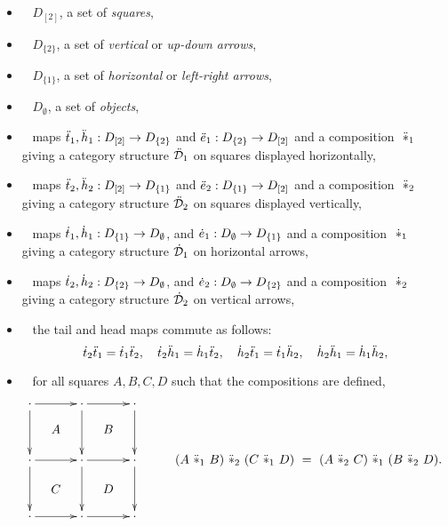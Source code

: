 \begin{itemize}
\item~ $D_{[2]}$, a set of \emph{squares},
\item~ $D_{\{2\}}$, a set of \emph{vertical} 
or \emph{up-down arrows},
\item~ $D_{\{1\}}$, a set of \emph{horizontal} 
or \emph{left-right arrows},
\item~ $D_{\emptyset}$, a set of \emph{objects}, 
\item~ maps $\ddot{t}_1,\ddot{h}_1 : D_{[2]} \to D_{\{2\}}$ 
       and $\ddot{e}_1 : D_{\{2\}} \to D_{[2]}$ 
       and a composition $~\ddot{\ast}_1~$ giving a category structure 
       $\ddot{\mathcal{D}}_1$ on squares displayed horizontally, 
\item~ maps $\ddot{t}_2,\ddot{h}_2 : D_{[2]} \to D_{\{1\}}$
       and $\ddot{e}_2 : D_{\{1\}} \to D_{[2]}$ 
       and a composition $~\ddot{\ast}_2~$ giving a category structure 
       $\ddot{\mathcal{D}}_2$ on squares displayed vertically, 
\item~ maps $\dot{t}_1,\dot{h}_1 : D_{\{1\}} \to D_{\emptyset}$, 
       and $\dot{e}_1 : D_{\emptyset} \to D_{\{1\}}$ 
       and a composition $~\dot{\ast}_1~$ 
       giving a category structure $\dot{\mathcal{D}}_1$ on horizontal arrows, 
\item~ maps $\dot{t}_2,\dot{h}_2 : D_{\{2\}} \to D_{\emptyset}$, 
       and $\dot{e}_2 : D_{\emptyset} \to D_{\{2\}}$ 
       and a composition $~\dot{\ast}_2~$ 
       giving a category structure $\dot{\mathcal{D}}_2$ on vertical arrows, 
\item~ the tail and head maps commute as follows:
$$
\dot{t}_2\ddot{t}_1 = \dot{t}_1\ddot{t}_2, \quad
\dot{t}_2\ddot{h}_1 = \dot{h}_1\ddot{t}_2, \quad
\dot{h}_2\ddot{t}_1 = \dot{t}_1\ddot{h}_2, \quad
\dot{h}_2\ddot{h}_1 = \dot{h}_1\ddot{h}_2,
$$
\item~ for all squares $A,B,C,D$ such that the compositions are defined,
$$
\xymatrix  @C=0.8pc @R=0.8pc{
\cdot \ar[rr] \ar[dd] 
  &   & \cdot \ar[rr] \ar[dd]
          &   & \cdot \ar[dd] 
                 &   &  \\
  & A &   & B &  &   &  \\
\cdot \ar[rr] \ar[dd] 
  &   & \cdot \ar[rr] \ar[dd]
          &   & \cdot \ar[dd] 
                 &   &  (A \ddasto B) \ddastt (C \ddasto D) ~=~
                        (A \ddastt C) \ddasto (B \ddastt D). \\
  & C &   & D &  &   &  \\
\cdot \ar[rr] 
  &   & \cdot \ar[rr] 
          &   & \cdot 
                 &   &  \\
}
$$
\end{itemize}

